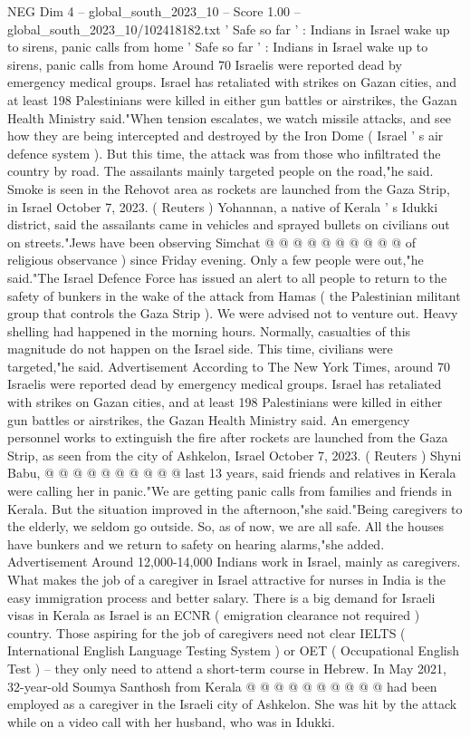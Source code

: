\begin{textsample}{NEG Dim 4 – global\_south\_2023\_10 – Score 1.00 – global\_south\_2023\_10/102418182.txt}  \label{ex:f4_neg_031}
' Safe so far ' : Indians in Israel wake up to sirens, panic calls from home ' Safe so far ' : Indians in Israel wake up to sirens, panic calls from home Around 70 Israelis were reported dead by emergency medical groups.
Israel has retaliated with strikes on Gazan cities, and at least 198 Palestinians were killed in either gun battles or airstrikes, the Gazan Health Ministry said."When tension escalates, we watch missile attacks, and see how they are being intercepted and destroyed by the Iron Dome ( Israel ' s air defence system ).
But this time, the attack was from those who infiltrated the country by road.
The assailants mainly targeted people on the road,"he said.
Smoke is seen in the Rehovot area as rockets are launched from the Gaza Strip, in Israel October 7, 2023. ( Reuters ) Yohannan, a native of Kerala ' s Idukki district, said the assailants came in vehicles and sprayed bullets on civilians out on streets."Jews have been observing Simchat @ @ @ @ @ @ @ @ @ @ of religious observance ) since Friday evening.
Only a few people were out,"he said."The Israel Defence Force has issued an alert to all people to return to the safety of bunkers in the wake of the attack from Hamas ( the Palestinian militant group that controls the Gaza Strip ).
We were advised not to venture out.
Heavy shelling had happened in the morning hours.
Normally, casualties of this magnitude do not happen on the Israel side.
This time, civilians were targeted,"he said.
Advertisement According to The New York Times, around 70 Israelis were reported dead by emergency medical groups.
Israel has retaliated with strikes on Gazan cities, and at least 198 Palestinians were killed in either gun battles or airstrikes, the Gazan Health Ministry said.
An emergency personnel works to extinguish the fire after rockets are launched from the Gaza Strip, as seen from the city of Ashkelon, Israel October 7, 2023. ( Reuters ) Shyni Babu, @ @ @ @ @ @ @ @ @ @ last 13 years, said friends and relatives in Kerala were calling her in panic."We are getting panic calls from families and friends in Kerala.
But the situation improved in the afternoon,"she said."Being caregivers to the elderly, we seldom go outside.
So, as of now, we are all safe.
All the houses have bunkers and we return to safety on hearing alarms,"she added.
Advertisement Around 12,000-14,000 Indians work in Israel, mainly as caregivers.
What makes the job of a caregiver in Israel attractive for nurses in India is the easy immigration process and better salary.
There is a big demand for Israeli visas in Kerala as Israel is an ECNR ( emigration clearance not required ) country.
Those aspiring for the job of caregivers need not clear IELTS ( International English Language Testing System ) or OET ( Occupational English Test ) -- they only need to attend a short-term course in Hebrew.
In May 2021, 32-year-old Soumya Santhosh from Kerala @ @ @ @ @ @ @ @ @ @ had been employed as a caregiver in the Israeli city of Ashkelon.
She was hit by the attack while on a video call with her husband, who was in Idukki.

\end{textsample}
